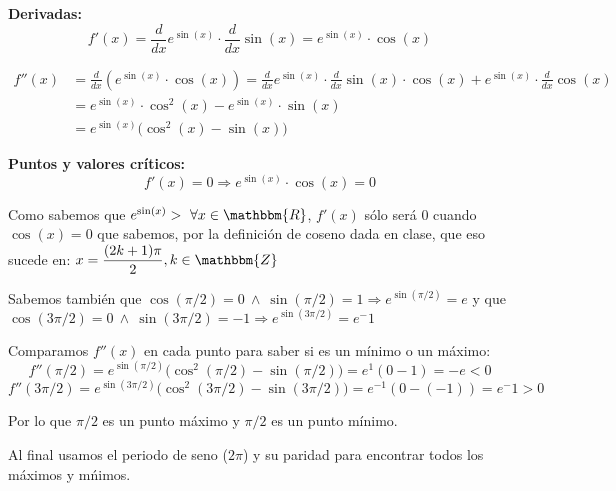\documentclass[12pt]{article}
\begin{document}
\begin{enumerate}[\hspace{9px} a)]
        \textbf{Derivadas: }
            \begin{equation*}
                f'(x) = \frac{d}{dx}e^{\sin(x)}\cdot \frac{d}{dx}\sin(x) = e^{\sin(x)}\cdot\cos(x)
            \end{equation*}

            \begin{align*}
                f''(x) &= \frac{d}{dx}\left(e^{\sin(x)}\cdot\cos(x)\right) = \frac{d}{dx}e^{\sin(x)}\cdot\frac{d}{dx}\sin(x)\cdot\cos(x)+e^{\sin(x)}\cdot\frac{d}{dx}\cos(x)\\
                &= e^{\sin(x)}\cdot\cos^2(x)-e^{\sin(x)}\cdot\sin(x)\\
                &= e^{\sin(x)}\big(\cos^2(x)-\sin(x)\big)
            \end{align*}

        \textbf{Puntos y valores cr\'iticos: }
            \begin{equation*}
                f'(x)=0 \Rightarrow e^{\sin(x)}\cdot\cos(x)=0
            \end{equation*}

            Como sabemos que \(e^{\sin(x)}> \ \forall x\in\mathbbm{R}\), \(f'(x)\) s\'olo ser\'a 0 cuando \(\cos(x)=0\) que sabemos, por la definici\'on de coseno dada en clase, que eso sucede en: \(\displaystyle x=\frac{(2k+1)\pi}{2},k\in\mathbbm{Z}\)\medskip

            Sabemos tambi\'en que \(\cos(\pi/2)=0 \ \wedge \ \sin(\pi/2)=1 \Rightarrow e^{\sin(\pi/2)}=e\) y que \(\cos(3\pi/2)=0 \ \wedge \ \sin(3\pi/2)=-1 \Rightarrow e^{\sin(3\pi/2)}=e^-1\)\medskip

            Comparamos \(f''(x)\) en cada punto para saber si es un m\'inimo o un m\'aximo:
            \begin{equation*}
                f''(\pi/2)=e^{\sin(\pi/2)}\big(\cos^2(\pi/2)-\sin(\pi/2)\big) = e^1(0-1) = -e<0
            \end{equation*}
            \begin{equation*}
                f''(3\pi/2)=e^{\sin(3\pi/2)}\big(\cos^2(3\pi/2)-\sin(3\pi/2)\big) = e^{-1}(0-(-1)) = e^-1>0
            \end{equation*}

            Por lo que \(\pi/2\) es un punto m\'aximo y \(\pi/2\) es un punto m\'inimo.

            Al final usamos el periodo de seno (\(2\pi\)) y su paridad para encontrar todos los m\'aximos y m\'nimos.\medskip


\end{enumerate}
\end{document}

